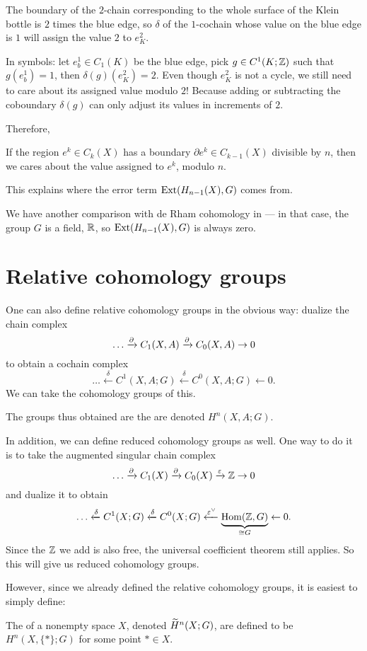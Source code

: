 The boundary of the $2$-chain corresponding to the whole surface of the Klein bottle is $2$ times
the blue edge, so $\delta$ of the $1$-cochain whose value on the blue edge is $1$
will assign the value $2$ to $e^2_K$.

In symbols: let $e^1_b \in C_1(K)$ be the blue edge, pick $g \in C^1(K; \mathbb Z)$ such that
$g(e^1_b) = 1$, then $\delta(g)(e^2_K) = 2$.
Even though $e^2_K$ is not a cycle, we still need to care about its assigned value modulo $2$!
Because adding or subtracting the coboundary $\delta(g)$ can only adjust its values in increments
of $2$.

Therefore,
\begin{moral}
	If the region $e^k \in C_k(X)$ has a boundary $\partial e^k \in C_{k-1}(X)$ divisible by $n$,
	then we cares about the value assigned to $e^k$, modulo $n$.
\end{moral}

This explains where the error term $\operatorname{Ext}(H_{n-1}(X), G)$ comes from.

We have another comparison with de Rham cohomology in  ---
in that case, the group $G$ is a field, $\mathbb R$, so $\operatorname{Ext}(H_{n-1}(X), G)$ is always zero.

\section{Relative cohomology groups}
One can also define relative cohomology groups in the obvious way:
dualize the chain complex
\[ \dots \xrightarrow{\partial} C_1(X,A) \xrightarrow{\partial} C_0(X,A) \to 0 \]
to obtain a cochain complex
\[
	\dots \xleftarrow\delta C^1(X,A;G) \xleftarrow\delta C^0(X,A;G)
	\leftarrow 0.
\]
We can take the cohomology groups of this.
\begin{definition}
	The groups thus obtained are the 
	are denoted $H^n(X,A;G)$.
\end{definition}

In addition, we can define reduced cohomology groups as well.
One way to do it is to take the augmented singular chain complex
\[ \dots \xrightarrow{\partial} C_1(X) \xrightarrow{\partial} C_0(X) \xrightarrow{\varepsilon} \mathbb Z \to 0 \]
and dualize it to obtain
\[
	\dots \xleftarrow\delta C^1(X;G) \xleftarrow\delta C^0(X;G)
	\xleftarrow{\varepsilon^\vee} \underbrace{\operatorname{Hom}(\mathbb Z, G)}_{\cong G}
	\leftarrow 0.
\]
Since the $\mathbb Z$ we add is also free,
the universal coefficient theorem still applies.
So this will give us reduced cohomology groups.

However, since we already defined the relative cohomology groups,
it is easiest to simply define:
\begin{definition}
	The  of a nonempty space $X$,
	denoted $\widetilde H^n(X; G)$,
	are defined to be $H^n(X, \{\ast\} ; G)$
	for some point $\ast \in X$.
\end{definition}


